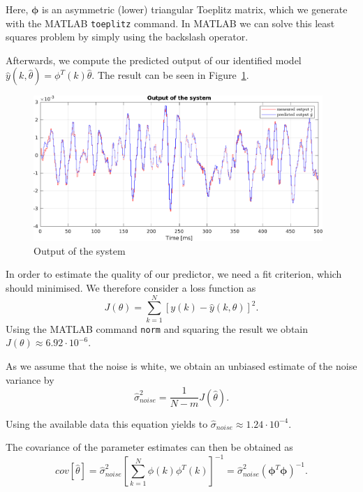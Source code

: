 \documentclass{scrartcl}
\begin{document}
Here, $\pmb{\phi}$ is an asymmetric (lower) triangular Toeplitz matrix, which we generate with the MATLAB \texttt{toeplitz} command.
In MATLAB we can solve this least squares problem by simply using the backslash operator. 

Afterwards, we compute the predicted output of our identified model $\hat{y} (k,\hat{\theta}) = \phi^{T} (k) \hat{\theta}$. The result can be seen in Figure~\ref{fig:output_fir}.

\begin{figure}[h]
	\centering
	\includegraphics[height=5.5cm]{figures/output.pdf}
	\caption{Output of the system}\label{fig:output_fir}
\end{figure}

In order to estimate the quality of our predictor, we need a fit criterion, which should minimised. We therefore consider a loss function as 
\begin{equation}\label{eq:J}
	J(\theta) = \sum\limits_{k=1}^N \left[y(k) - \hat{y}(k,\theta) \right]^2.
\end{equation}
Using the MATLAB command \texttt{norm} and squaring the result we obtain $ J(\theta) \approx 6.92 \cdot 10^{-6}$. 

As we assume that the noise is white, we obtain an unbiased estimate of the noise variance by
\begin{equation}\label{eq:sigma}
	\hat{\sigma}_{noise}^{2} = \frac{1}{N-m} J(\hat{\theta}) .
\end{equation}

Using the available data this equation yields to $ \hat{\sigma}_{noise} \approx 1.24 \cdot 10^{-4} $.

The covariance of the parameter estimates can then be obtained as
\begin{equation}\label{eq:cov}
	cov[\hat{\theta}] = \hat{\sigma}_{noise}^2 \left[ \sum\limits_{k=1}^N \phi(k)\phi^T(k) \right]^{-1} = \hat{\sigma}_{noise}^2 \left( \pmb{\phi}^T \pmb{\phi} \right)^{-1} .
\end{equation}
\end{document}
